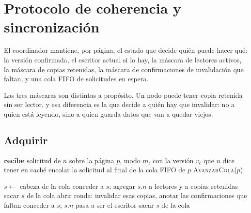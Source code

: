 \section{Protocolo de coherencia y sincronización}
\label{sec:proto}

El coordinador mantiene, por página, el estado que decide quién puede hacer
qué: la versión confirmada, el escritor actual si lo hay, la máscara de
lectores activos, la máscara de copias retenidas, la máscara de confirmaciones
de invalidación que faltan, y una cola FIFO de solicitudes en espera.

Las tres máscaras son distintas a propósito. Un nodo puede tener copia
retenida sin ser lector, y esa diferencia es la que decide a quién hay que
invalidar: no a quien está leyendo, sino a quien guarda datos que van a quedar
viejos.

\subsection{Adquirir}

\begin{algorithm}[H]
\caption{Solicitud de acceso en el coordinador}
\begin{algorithmic}[1]
\STATE \textbf{recibe} solicitud de $n$ sobre la página $p$, modo $m$,
       con la versión $v_c$ que $n$ dice tener en caché
\STATE encolar la solicitud al final de la cola FIFO de $p$
\STATE \textsc{AvanzarCola}($p$)
\end{algorithmic}
\end{algorithm}

\begin{algorithm}[H]
\caption{\textsc{AvanzarCola}($p$)}
\begin{algorithmic}[1]
  \STATE $s \leftarrow$ cabeza de la cola
    \STATE conceder a $s$; agregar $s.n$ a lectores y a copias retenidas
    \STATE sacar $s$ de la cola
      \STATE abrir ronda: invalidar esas copias, anotar las confirmaciones
             que faltan
      \RETURN {}
    \ENDIF
    \STATE conceder a $s$; $s.n$ pasa a ser el escritor
    \STATE sacar $s$ de la cola
  \ELSE
    \RETURN {}
  \ENDIF
\ENDWHILE
\end{algorithmic}
\end{algorithm}

